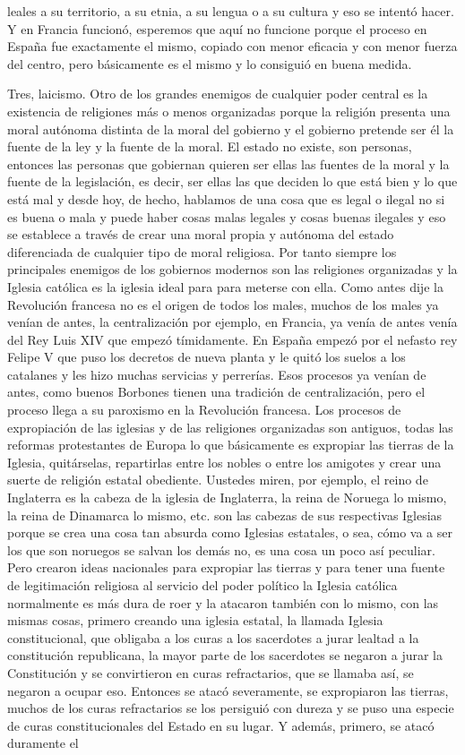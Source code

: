 leales a su territorio, a su etnia, a su lengua o a su cultura y eso se intentó hacer. Y en Francia funcionó, esperemos que aquí no funcione porque el proceso en España fue exactamente el mismo, copiado con menor eficacia y con menor fuerza del centro, pero básicamente es el mismo y lo consiguió en buena medida.

Tres, laicismo. Otro de los grandes enemigos de cualquier poder central es la existencia de religiones más o menos organizadas porque la religión presenta una moral autónoma distinta de la moral del gobierno y el gobierno pretende ser él la fuente de la ley y la fuente de la moral. El estado no existe, son personas, entonces las personas que gobiernan quieren ser ellas las fuentes de la moral y la fuente de la legislación, es decir, ser ellas las que deciden lo que está bien y lo que está mal y desde hoy, de hecho, hablamos de una cosa que es legal o ilegal no si es buena o mala y puede haber cosas malas legales y cosas buenas ilegales y eso se establece a través de crear una moral propia y autónoma del estado diferenciada de cualquier tipo de moral religiosa. Por tanto siempre los principales enemigos de los gobiernos modernos son las religiones organizadas y la Iglesia católica es la iglesia ideal para para meterse con ella. Como antes dije la Revolución francesa no es el origen de todos los males, muchos de los males ya venían de antes, la centralización por ejemplo, en Francia, ya venía de antes venía del Rey Luis XIV que empezó tímidamente. En España empezó por el nefasto rey Felipe V que puso los decretos de nueva planta y le quitó los suelos a los catalanes y les hizo muchas servicias y perrerías. Esos procesos ya venían de antes, como buenos Borbones tienen una tradición de centralización, pero el proceso llega a su paroxismo en la Revolución francesa. Los procesos de expropiación de las iglesias y de las religiones organizadas son antiguos, todas las reformas protestantes de Europa lo que básicamente es expropiar las tierras de la Iglesia, quitárselas, repartirlas entre los nobles o entre los amigotes y crear una suerte de religión estatal obediente. Uustedes miren, por ejemplo, el reino de Inglaterra es la cabeza de la iglesia de Inglaterra, la reina de Noruega lo mismo, la reina de Dinamarca lo mismo, etc. son las cabezas de sus respectivas Iglesias porque se crea una cosa tan absurda como Iglesias estatales, o sea, cómo va a ser los que son noruegos se salvan los demás no, es una cosa un poco así peculiar. Pero crearon ideas nacionales para expropiar las tierras y para tener una fuente de legitimación religiosa al servicio del poder político la Iglesia católica normalmente es más dura de roer y la atacaron también con lo mismo, con las mismas cosas, primero creando una iglesia estatal, la llamada Iglesia constitucional, que obligaba a los curas a los sacerdotes a jurar lealtad a la constitución republicana, la mayor parte de los sacerdotes se negaron a jurar la Constitución y se convirtieron en curas refractarios, que se llamaba así, se negaron a ocupar eso. Entonces se atacó severamente, se expropiaron las tierras, muchos de los curas refractarios se los persiguió con dureza y se puso una especie de curas constitucionales del Estado en su lugar. Y además, primero, se atacó duramente el 